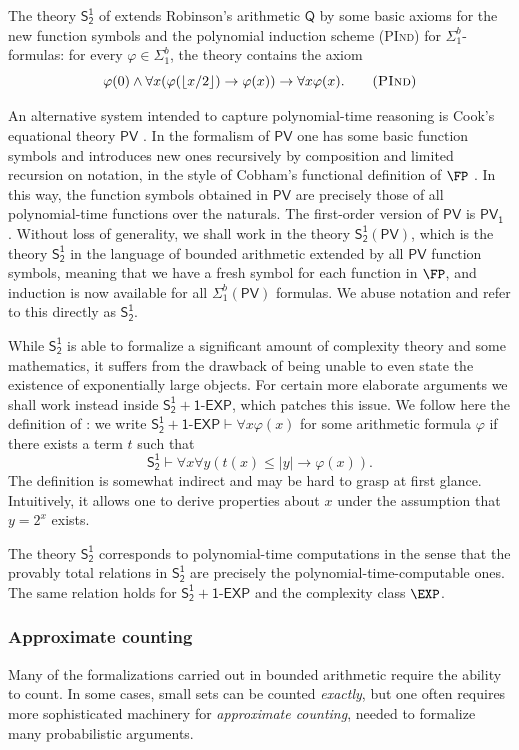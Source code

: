 \documentclass[11pt]{article}
\newcommand{\SOT}{\mathsf{S^1_2}}
\renewcommand{\PV}{\mathsf{PV}}
\newcommand{\PVO}{\mathsf{PV_1}}
\newcommand{\SOTEXP}{\mathsf{S^1_2} + \mathsf{1\textsf{-}EXP}}
\theoremstyle{definition}
\theoremstyle{plain}
\theoremstyle{remark}
\begin{document}
The theory $\SOT$ of \citeauthor{Buss85} \cite{Buss85} extends Robinson's arithmetic $\mathsf{Q}$ by some basic axioms for the new function symbols and the polynomial induction scheme (\textsc{PInd}) for $\Sigma_1^b$-formulas: for every $\varphi \in \Sigma_1^b$, the theory contains the axiom
\begin{equation}
    \varphi(0) \land \forall x (\varphi (\lfloor x/2 \rfloor) \to \varphi(x)) \to \forall x \varphi(x).
    \tag{\textsc{PInd}}
\end{equation}

An alternative system intended to capture polynomial-time reasoning is Cook's equational theory $\PV$ \cite{Cook75}. In the formalism of $\PV$ one has some basic function symbols and introduces new ones recursively by composition and limited recursion on notation, in the style of Cobham's functional definition of $\FP$ \cite{Cob64}. In this way, the function symbols obtained in $\PV$ are precisely those of all polynomial-time functions over the naturals. The first-order version of $\PV$ is $\PVO$ \cite{KPT91, Buss95, Cook96}. Without loss of generality, we shall work in the theory $\SOT(\PV)$, which is the theory $\SOT$ in the language of bounded arithmetic extended by all $\PV$ function symbols, meaning that we have a fresh symbol for each function in $\FP$, and induction is now available for all $\Sigma_1^b(\PV)$ formulas. We abuse notation and refer to this directly as $\SOT$.

While $\SOT$ is able to formalize a significant amount of complexity theory and some mathematics, it suffers from the drawback of being unable to even state the existence of exponentially large objects. For certain more elaborate arguments we shall work instead inside $\SOTEXP$, which patches this issue. We follow here the definition of \citeauthor{Kra04} \cite[Cor. 2.2]{Kra04}: we write $\SOTEXP \vdash \forall x \varphi(x)$ for some arithmetic formula $\varphi$ if there exists a term $t$ such that
$$\SOT \vdash \forall x \forall y (t(x) \leq |y| \to \varphi(x)).$$
The definition is somewhat indirect and may be hard to grasp at first glance. Intuitively, it allows one to derive properties about $x$ under the assumption that $y = 2^x$ exists.

The theory $\SOT$ corresponds to polynomial-time computations in the sense that the provably total relations in $\SOT$ are precisely the polynomial-time-computable ones. The same relation holds for $\SOTEXP$ and the complexity class $\EXP$.

\subsubsection{Approximate counting}
\label{subsec:apc}
Many of the formalizations carried out in bounded arithmetic require the ability to count. In some cases, small sets can be counted \emph{exactly}, but one often requires more sophisticated machinery for \emph{approximate counting}, needed to formalize many probabilistic arguments.
\end{document}
